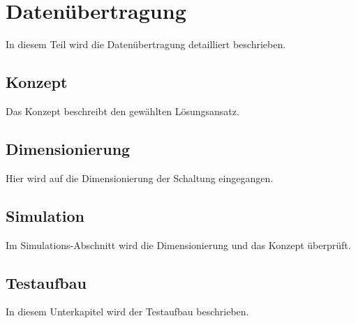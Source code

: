 \section{Datenübertragung}
In diesem Teil wird die Datenübertragung detailliert beschrieben.
\subsection{Konzept}
Das Konzept beschreibt den gewählten Lösungsansatz.
\subsection{Dimensionierung}
Hier wird auf die Dimensionierung der Schaltung eingegangen.
\subsection{Simulation}
Im Simulations-Abschnitt wird die Dimensionierung und das Konzept überprüft.
\subsection{Testaufbau}
In diesem Unterkapitel wird der Testaufbau beschrieben.